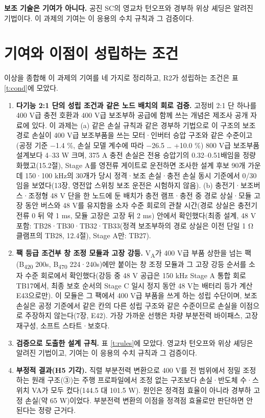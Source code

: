 \textbf{보조 기술은 기여가 아니다.} 공진 SC의 영교차 턴오프\cite{b53,b54}와 경부하 위상 셰딩\cite{b55}은 알려진 기법이다. 이 과제의 기여는 이 응용의 수치 규칙과 그 검증이다.

\section{기여와 이점이 성립하는 조건}

이상을 종합해 이 과제의 기여를 네 가지로 정리하고, R2가 성립하는 조건은 표 \ref{t:cond}에 모았다.

\begin{enumerate}[label=\arabic*.]
\item \textbf{다기능 2:1 단의 성립 조건과 같은 노드 배치의 회로 검증.} 고정비 2:1 단 하나를 400 V급 충전 호환과 400 V급 보조부하 공급에 함께 쓰는 개념은 제조사 공개 자료\cite{b35,b36,b37,b38}에 있다. 이 과제는 (a) 같은 손실 규칙과 같은 경부하 기법으로 이 구조의 보조 경로 손실이 400 V급 보조부품을 쓰는 모터·인버터 승압 구조와 같은 수준이고(공정 기준 −1.4 \%, 손실 모델 계수에 따라 −26.5 … +10.0 \%) 800 V급 보조부품 설계보다 4–33 W 크며, 375 A 충전 손실은 전용 승압기의 0.32–0.51배임을 정량화했고(15.2절), Stage A를 영전류 게이트로 운전하면 조사한 설계 후보 90개 가운데 150·100 kHz의 30개가 당시 정격·보조 손실·충전 손실 동시 기준에서 0/30임을 보였다(13장, 영전압 스위칭 보조 운전은 시험하지 않음). (b) 충전기·보조버스·조정형 48 V 단을 한 노드에 둔 배치가 충전 램프·충전 중 경로 상실·모듈 고장 동안 버스와 48 V를 유지함을 소자 수준 회로의 관찰 시간(경로 상실은 충전기 전류 0 뒤 약 1 ms, 모듈 고장은 고장 뒤 2 ms) 안에서 확인했다(최종 설계, 48 V 포함: TB28·TB30·TB32·TB33(정격 보조부하의 경로 상실은 이전 단일 1 Ω 클램프의 TB28, 12.4절), Stage A만: TB27).
\item \textbf{팩 등급 조건부 창 조정 모듈과 고장 강등.} V\textsubscript{A}가 400 V급 부품 상한을 넘는 팩(B\textsubscript{420} 200s, B\textsubscript{470} 224·240s)에만 붙이는 창 조정 모듈과 그 고장 강등 순서를 소자 수준 회로에서 확인했다(강등 중 48 V 공급은 150 kHz Stage A 통합 회로 TB17에서, 최종 보호 순서의 Stage C 일시 정지 동안 48 V는 배터리 등가 계산 E43으로만). 이 모듈은 그 팩에서 400 V급 부품을 쓰게 하는 성립 수단이며, 보조 손실은 공정 기준에서 같은 칸의 다른 성립 구조와 같은 수준이므로 손실을 이점으로 주장하지 않는다(7장, E42). 가장 가까운 선행은 차량 부분전력 바이패스\cite{b47}, 고장 재구성\cite{b48}, 소프트 스타트·보호\cite{b49}다.
\item \textbf{검증으로 도출한 설계 규칙.} 표 \ref{t:rules}에 모았다. 영교차 턴오프와 위상 셰딩은 알려진 기법이고, 기여는 이 응용의 수치 규칙과 그 검증이다.
\item \textbf{부정적 결과(H5 기각).} 직렬 부분전력 변환으로 400 V를 전 범위에서 정밀 조정하는 원래 구조(③)는 주행 프로파일에서 조정 없는 구조보다 손실·반도체 수·스위치 VA가 모두 컸다(144.5 대 101.5 W). 원인은 정격점 효율이 아니라 경부하 고정 손실(약 65 W)이었다. 부분전력 변환의 이점을 정격점 효율로만 판단하면 안 된다는 정량 근거다.
\end{enumerate}

